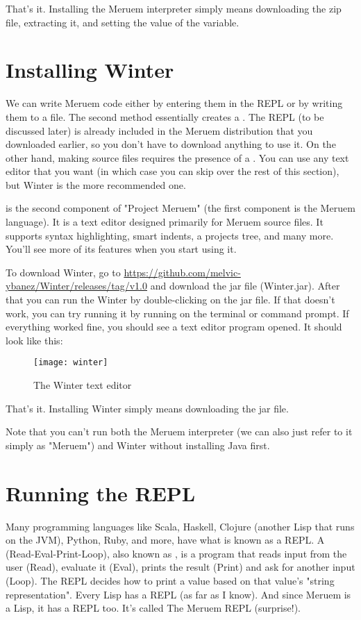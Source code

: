 That's it. Installing the Meruem interpreter simply means downloading the zip file, extracting it, and setting the value of the  variable.

\section{Installing Winter}
We can write Meruem code either by entering them in the REPL or by writing them to a file. The second method essentially creates a . The REPL (to be discussed later) is already included in the Meruem distribution that you downloaded earlier, so you don't have to download anything to use it. On the other hand, making source files requires the presence of a . You can use any text editor that you want (in which case you can skip over the rest of this section), but Winter is the more recommended one. 

 is the second component of "Project Meruem" (the first component is the Meruem language). It is a text editor designed primarily for Meruem source files. It supports syntax highlighting, smart indents, a projects tree, and many more. You'll see more of its features when you start using it.

To download Winter, go to \url{https://github.com/melvic-ybanez/Winter/releases/tag/v1.0} and download the jar file (Winter.jar). After that you can run the Winter by double-clicking on the jar file. If that doesn't work, you can try running it by running  on the terminal or command prompt. If everything worked fine, you should see a text editor program opened. It should look like this:

\begin{figure}[H]
\texttt{[image: winter]}
\caption{The Winter text editor}
\centering
\end{figure}

That's it. Installing Winter simply means downloading the jar file.

Note that you can't run both the Meruem interpreter (we can also just refer to it simply as "Meruem") and Winter without installing Java first.

\section{Running the REPL}
Many programming languages like Scala, Haskell, Clojure (another Lisp that runs on the JVM), Python, Ruby, and more, have what is known as a REPL. A  (Read-Eval-Print-Loop), also known as , is a program that reads input from the user (Read), evaluate it (Eval), prints the result (Print) and ask for another input (Loop). The REPL decides how to print a value based on that value's "string representation". Every Lisp has a REPL (as far as I know). And since Meruem is a Lisp, it has a REPL too. It's called The Meruem REPL (surprise!). 

